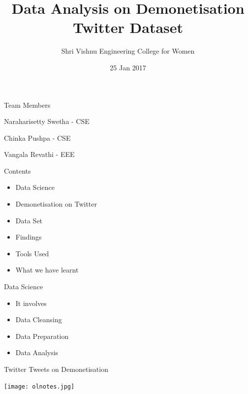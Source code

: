 \documentclass[14pt]{beamer}
\title[]{Data Analysis on Demonetisation Twitter Dataset}
\author [SVECW]{Shri Vishnu Engineering College for Women}
\institute[]{Team - 5}
\date{25 Jan 2017}
\begin{document}
\begin{frame}
  \titlepage
\end{frame}

\begin{frame}{Team Members}
   \item Naraharisetty Swetha                         - CSE
   \item Chinka Pushpa                       -         CSE
   \item Vangala Revathi                     -         EEE
\end{frame}

\begin{frame}{Contents}
  \begin{itemize}
  \item Data Science
  \item Demonetisation on Twitter
  \item Data Set
  \item Findings
  \item Tools Used
  \item What we have learnt
  \end{itemize}
\end{frame}

\begin{frame}{Data Science}
  \begin{itemize}
    \item It involves
    \pause
  \item Data Cleansing 
    \pause
  \item Data Preparation 
    \pause
  \item Data Analysis
  \end{itemize}
\end{frame}

\begin{frame}{Twitter Tweets on Demonetisation }
  \begin{center}
    \texttt{[image: olnotes.jpg]}
  \end{center}
\end{frame}
\end{document}
